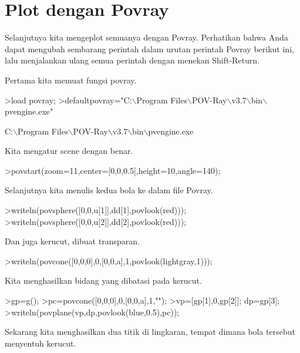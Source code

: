 \documentclass[a4paper,11pt,oneside,enabledeprecatedfontcommands]{scrbook}
\newenvironment{eulernotebook}{}{}
\newcommand{\eulersubheading}[1]{\section{#1}}
\newenvironment{eulercomment}{\par\medskip\noindent}{\par\medskip}
\begin{document}
\begin{eulernotebook}
\eulersubheading{Plot dengan Povray}
\begin{eulercomment}
Selanjutnya kita mengeplot semuanya dengan Povray. Perhatikan bahwa Anda dapat mengubah sembarang
perintah dalam urutan perintah Povray berikut ini, lalu menjalankan ulang semua perintah dengan
menekan Shift-Return.

Pertama kita memuat fungsi povray.
\end{eulercomment}
\begin{eulerprompt}
>load povray;
>defaultpovray="C:\(\backslash\)Program Files\(\backslash\)POV-Ray\(\backslash\)v3.7\(\backslash\)bin\(\backslash\)pvengine.exe"
\end{eulerprompt}
\begin{euleroutput}
C:\(\backslash\)Program Files\(\backslash\)POV-Ray\(\backslash\)v3.7\(\backslash\)bin\(\backslash\)pvengine.exe
\end{euleroutput}
\begin{eulercomment}
Kita mengatur scene dengan benar.
\end{eulercomment}
\begin{eulerprompt}
>povstart(zoom=11,center=[0,0,0.5],height=10,angle=140);
\end{eulerprompt}
\begin{eulercomment}
Selanjutnya kita menulis kedua bola ke dalam file Povray.
\end{eulercomment}
\begin{eulerprompt}
>writeln(povsphere([0,0,u[1]],dd[1],povlook(red)));
>writeln(povsphere([0,0,u[2]],dd[2],povlook(red)));
\end{eulerprompt}
\begin{eulercomment}
Dan juga kerucut, dibuat transparan.
\end{eulercomment}
\begin{eulerprompt}
>writeln(povcone([0,0,0],0,[0,0,a],1,povlook(lightgray,1)));
\end{eulerprompt}
\begin{eulercomment}
Kita menghasilkan bidang yang dibatasi pada kerucut.
\end{eulercomment}
\begin{eulerprompt}
>gp=g();
>pc=povcone([0,0,0],0,[0,0,a],1,"");
>vp=[gp[1],0,gp[2]]; dp=gp[3];
>writeln(povplane(vp,dp,povlook(blue,0.5),pc));
\end{eulerprompt}
\begin{eulercomment}
Sekarang kita menghasilkan dua titik di lingkaran, tempat dimana bola tersebut menyentuh kerucut.
\end{eulercomment}

\end{eulernotebook}
\end{document}
